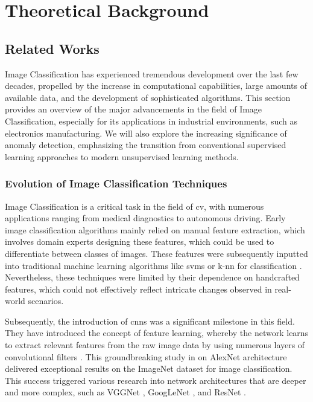 \chapter{Theoretical Background}

\section{Related Works}

Image Classification has experienced tremendous development over the last few decades, propelled by the increase in computational capabilities, large amounts of available data, and the development of sophisticated algorithms. This section provides an overview of the major advancements in the field of Image Classification, especially for its applications in industrial environments, such as electronics manufacturing. We will also explore the increasing significance of anomaly detection, emphasizing the transition from conventional supervised learning approaches to modern unsupervised learning methods.

\subsection{Evolution of Image Classification Techniques}

Image Classification is a critical task in the field of \gls{cv}, with numerous applications ranging from medical diagnostics to autonomous driving. Early image classification algorithms mainly relied on manual feature extraction, which involves domain experts designing these features, which could be used to differentiate between classes of images. These features were subsequently inputted into traditional machine learning algorithms like \glspl{svm} or \gls{k-nn} for classification \cite{LeCun2015}. Nevertheless, these techniques were limited by their dependence on handcrafted features, which could not effectively reflect intricate changes observed in real-world scenarios.

Subsequently, the introduction of \glspl{cnn} was a significant milestone in this field. They have introduced the concept of feature learning, whereby the network learns to extract relevant features from the raw image data by using numerous layers of convolutional filters \cite{NIPS2012_c399862d}. This groundbreaking study in \cite{NIPS2012_c399862d} on AlexNet architecture delivered exceptional results on the ImageNet dataset for image classification. This success triggered various research into network architectures that are deeper and more complex, such as VGGNet \cite{simonyan2015deepconvolutionalnetworkslargescale}, GoogLeNet \cite{7298594}, and ResNet \cite{he2016deep}.

